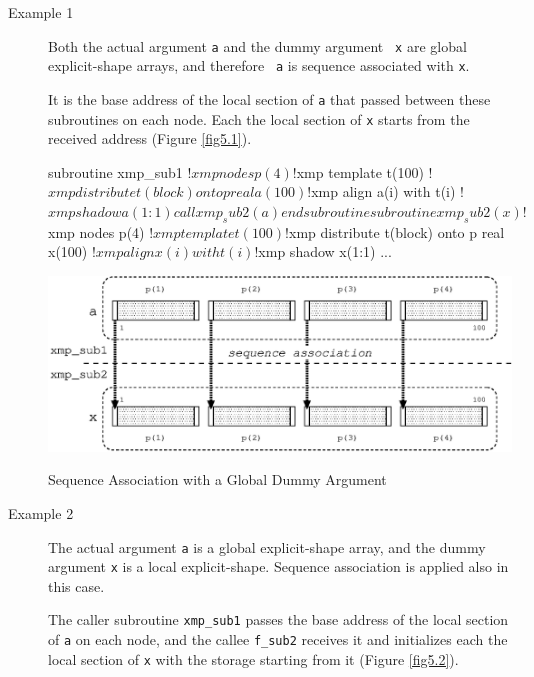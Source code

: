 \begin{description}

\item[Example 1]

	   Both the actual argument {\tt a} and the dummy argument {\tt
	   x} are global explicit-shape arrays, and therefore {\tt
	   a} is sequence associated with {\tt x}.

	   It is the base address of the local section of {\tt a} that
	   passed between these subroutines on each node. Each the local
	   section of {\tt x} starts from the received address (Figure
	   \ref{fig5.1}).

\begin{Fexample}
      subroutine xmp_sub1
!$xmp nodes p(4)
!$xmp template t(100)
!$xmp distribute t(block) onto p
      real a(100)
!$xmp align a(i) with t(i)
!$xmp shadow a(1:1) 
      call xmp_sub2(a)
      end subroutine

      subroutine xmp_sub2(x)
!$xmp nodes p(4)
!$xmp template t(100)
!$xmp distribute t(block) onto p
      real x(100)
!$xmp align x(i) with t(i)
!$xmp shadow x(1:1) 
      ...
\end{Fexample}

\begin{myfigure}
 \includegraphics[scale=0.7]{figs/fig5.1.eps}
 \caption{Sequence Association with a Global Dummy Argument}
 \label{fig5.1}
\end{myfigure}

\item[Example 2]

	   The actual argument {\tt a} is a global explicit-shape array,
	   and the dummy argument {\tt x} is a local explicit-shape. 
	   Sequence association is applied also in this case.

	   The caller subroutine {\tt xmp\_sub1} passes the base address
	   of the local section of {\tt a} on each node, and the callee
	   {\tt f\_sub2} receives it and initializes each the local
	   section of {\tt x} with the storage starting from it (Figure
	   \ref{fig5.2}).


\end{description}
